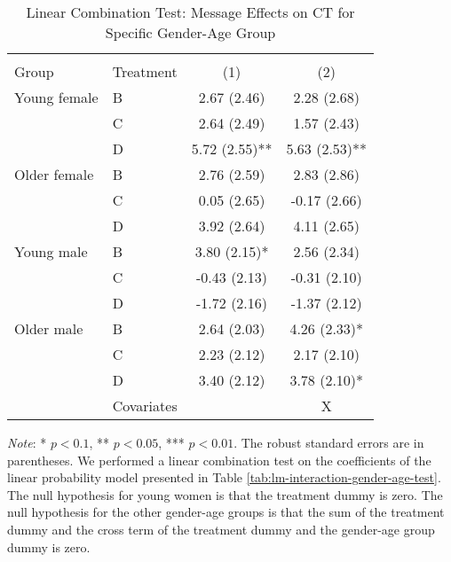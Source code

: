 \documentclass[12pt, a4paper]{article}
\begin{document}
\begin{table}[H]

\caption{\label{tab:lh-interaction-gender-age-test}Linear Combination Test: Message Effects on CT for Specific Gender-Age Group}
\centering
\fontsize{8}{10}\selectfont
\begin{threeparttable}
\begin{tabular}[t]{>{\raggedright\arraybackslash}p{8em}>{\raggedright\arraybackslash}p{8em}cc}
\toprule
\multicolumn{2}{c}{ } & \multicolumn{2}{c}{CT} \\
\cmidrule(l{3pt}r{3pt}){3-4}
Group & Treatment & (1) & (2)\\
\midrule
Young female & B & 2.67 (2.46) & 2.28 (2.68)\\
 & C & 2.64 (2.49) & 1.57 (2.43)\\
 & D & 5.72 (2.55)** & 5.63 (2.53)**\\
Older female & B & 2.76 (2.59) & 2.83 (2.86)\\
 & C & 0.05 (2.65) & -0.17 (2.66)\\
 & D & 3.92 (2.64) & 4.11 (2.65)\\
Young male & B & 3.80 (2.15)* & 2.56 (2.34)\\
 & C & -0.43 (2.13) & -0.31 (2.10)\\
 & D & -1.72 (2.16) & -1.37 (2.12)\\
Older male & B & 2.64 (2.03) & 4.26 (2.33)*\\
 & C & 2.23 (2.12) & 2.17 (2.10)\\
 & D & 3.40 (2.12) & 3.78 (2.10)*\\
\midrule
 & Covariates &  & X\\
\bottomrule
\end{tabular}
\begin{tablenotes}
\item \emph{Note}: * $p < 0.1$, ** $p < 0.05$, *** $p < 0.01$. The robust standard errors are in parentheses. We performed a linear combination test on the coefficients of the linear probability model presented in Table \ref{tab:lm-interaction-gender-age-test}. The null hypothesis for young women is that the treatment dummy is zero. The null hypothesis for the other gender-age groups is that the sum of the treatment dummy and the cross term of the treatment dummy and the gender-age group dummy is zero.
\end{tablenotes}
\end{threeparttable}
\end{table}
\end{document}
